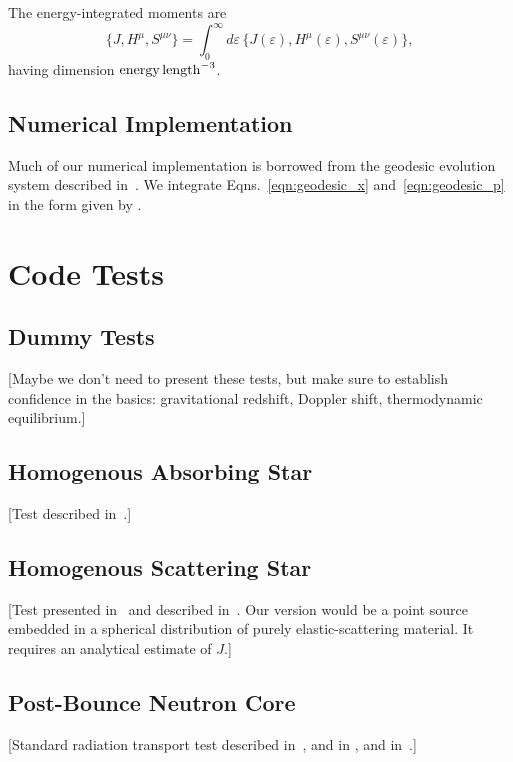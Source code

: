 \documentclass[aps,prd,twocolumn,superscriptaddress]{revtex4-1}
\newcommand{\todo}[1]{\marginpar{\tiny{\textcolor{red}{#1}}}}
\begin{document}
The energy-integrated moments are
\begin{equation}
  \label{eqn:J_H_S_eps_integrated}
  \big\{ J,H^\mu,S^{\mu\nu} \big\} = \int_0^\infty d\varepsilon \,
  \big\{ J(\varepsilon),H^\mu(\varepsilon),S^{\mu\nu}(\varepsilon) \big\},
\end{equation}
having dimension ${\rm energy}\,{\rm length}^{-3}$.

\subsection{Numerical Implementation}
\label{ssec:numerical}
Much of our numerical implementation is borrowed from the geodesic evolution
system described in~\cite{bohn2016-code}.
We integrate Eqns.~\ref{eqn:geodesic_x} and~\ref{eqn:geodesic_p} in the form given by
\citep{hugh1994-eh_finding}.
\todo{describe eqns for $f_{\rm integ}$ and $\tau$}
\todo{describe $\nu$-specific numerics}

\section{Code Tests}
\label{sec:tests}

\subsection{Dummy Tests}
[Maybe we don't need to present these tests, but make sure to establish
confidence in the basics:
gravitational redshift, Doppler shift, thermodynamic equilibrium.]
\todo{setup and run dummy tests}

\subsection{Homogenous Absorbing Star}
[Test described in~\cite[Sec.~3.2]{smit1997-two_moment}.]
\todo{Jerred: run test}

\subsection{Homogenous Scattering Star}
\todo{maybe drop this test}
[Test presented in~\cite{humm1971-grey_transfer}
and described in~\cite[Sec.~9.1.1]{abdi2012-monte_carlo}.
Our version would be a point source embedded in a spherical distribution
of purely elastic-scattering material. It requires an analytical estimate
of $J$.]
\todo{formulate analytic $J$.}

\subsection{Post-Bounce Neutron Core}
[Standard radiation transport test described in~\cite{ocon2015-gr1d_with_nu},
and in \cite[App.~E.6]{fouc2015-m1_nsbh},
and in~\cite{abdi2012-monte_carlo}.]
\todo{Evan: provide initial data and $H^r(\varepsilon)$}
\todo{Jerred: setup and run test}
\end{document}
